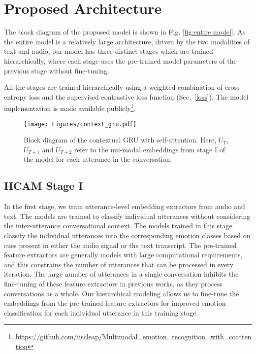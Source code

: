 \documentclass[lettersize,journal]{IEEEtran}
\begin{document}
\section{Proposed Architecture}\label{proposal}

The block diagram of the proposed model is shown in Fig. \ref{fig:entire model}. As the entire model is a relatively large architecture, driven by the two modalities of text and audio, our model has three distinct stages which are trained hierarchically, where each stage uses the pre-trained model parameters of the previous stage without fine-tuning. 

All the stages are trained hierarchically using a weighted combination of cross-entropy loss and the supervised contrastive loss function (Sec.~\ref{loss}). 
The model implementation is made available publicly\footnote{\url{https://github.com/iiscleap/Multimodal_emotion_recognition_with_coattention}}. 
\begin{figure}[t!]
    \centering
    \texttt{[image: Figures/context\_gru.pdf]}
    \caption{Block diagram of the contextual GRU with self-attention. Here, $U_{T}$, $U_{T \pm 1}$ and $U_{T \pm 2}$ refer to the uni-modal embeddings from stage I of the model for each utterance in the conversation.}
    \label{fig:context gru}
\end{figure}
\subsection{HCAM Stage I}\label{stage1}
In the first stage, we train utterance-level embedding extractors from audio and text. The models are trained to classify individual utterances without considering the inter-utterance conversational context. The models trained in this stage classify the individual utterances into the corresponding emotion classes based on cues present in either the audio signal or the text transcript. The pre-trained feature extractors are generally models with large computational requirements, and this constrains the number of utterances that can be processed in every iteration. The large number of utterances in a single conversation inhibits the fine-tuning of these feature extractors in previous works, as they process conversations as a whole. Our hierarchical modeling allows us to fine-tune the embeddings from the pre-trained feature extractors for improved emotion classification for each individual utterance in this training stage.
\end{document}
